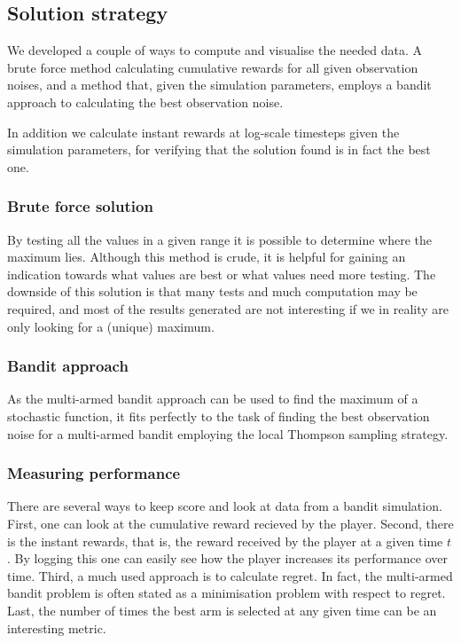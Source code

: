 \subsection{Solution strategy}
We developed a couple of ways to compute and visualise the needed data.
A brute force method calculating cumulative rewards for all given observation noises, and a method that, given the simulation parameters, employs a bandit approach to calculating the best observation noise.

In addition we calculate instant rewards at log-scale timesteps given the simulation parameters, for verifying that the solution found is in fact the best one.

\subsubsection{Brute force solution}
By testing all the values in a given range it is possible to determine where the maximum lies.
Although this method is crude, it is helpful for gaining an indication towards what values are best or what values need more testing.
The downside of this solution is that many tests and much computation may be required, and most of the results generated are not interesting if we in reality are only looking for a (unique) maximum.

\subsubsection{Bandit approach}
As the multi-armed bandit approach can be used to find the maximum of a
stochastic function, it fits perfectly to the task of finding the best
observation noise for a multi-armed bandit employing the local Thompson
sampling strategy.

\subsubsection{Measuring performance}
There are several ways to keep score and look at data from a bandit simulation.
First, one can look at the cumulative reward recieved by the player.
Second, there is the instant rewards, that is, the reward received by the player at a given time $t$.
By logging this one can easily see how the player increases its performance over time.
Third, a much used approach is to calculate regret.
In fact, the multi-armed bandit problem is often stated as a minimisation problem with respect to regret.
Last, the number of times the best arm is selected at any given time can be an interesting metric.

